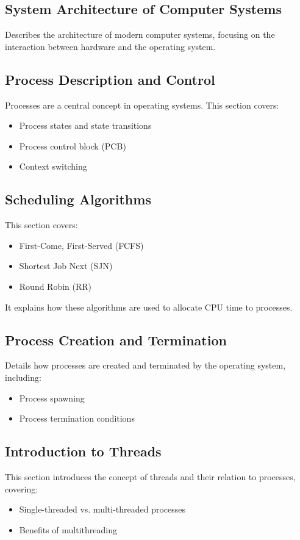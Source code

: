 \documentclass[12pt]{article}
\begin{document}
\subsection{System Architecture of Computer Systems}
Describes the architecture of modern computer systems, focusing on the interaction between hardware and the operating system.

\subsection{Process Description and Control}
Processes are a central concept in operating systems. This section covers:
\begin{itemize}
    \item Process states and state transitions
    \item Process control block (PCB)
    \item Context switching
\end{itemize}

\subsection{Scheduling Algorithms}
This section covers:
\begin{itemize}
    \item First-Come, First-Served (FCFS)
    \item Shortest Job Next (SJN)
    \item Round Robin (RR)
\end{itemize}
It explains how these algorithms are used to allocate CPU time to processes.

\subsection{Process Creation and Termination}
Details how processes are created and terminated by the operating system, including:
\begin{itemize}
    \item Process spawning
    \item Process termination conditions
\end{itemize}

\subsection{Introduction to Threads}
This section introduces the concept of threads and their relation to processes, covering:
\begin{itemize}
    \item Single-threaded vs. multi-threaded processes
    \item Benefits of multithreading
\end{itemize}
\end{document}
